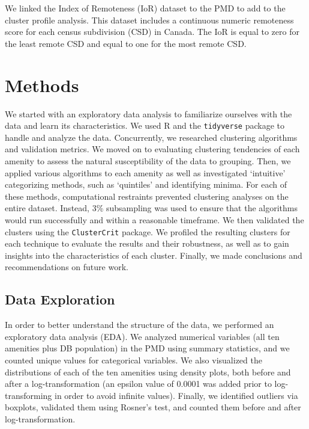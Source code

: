 \documentclass[11pt, a4paper]{article}
\begin{document}
We linked the Index of Remoteness (IoR) dataset to the PMD to add to the cluster profile analysis. This dataset includes a continuous numeric remoteness score for each census subdivision (CSD) in Canada. The IoR is equal to zero for the least remote CSD and equal to one for the most remote CSD. 









\pagebreak 
\section{Methods}

We started with an exploratory data analysis to familiarize ourselves with the data and learn its characteristics. We used R and the \texttt{tidyverse} package to handle and analyze the data. Concurrently, we researched clustering algorithms and validation metrics. We moved on to evaluating clustering tendencies of each amenity to assess the natural susceptibility of the data to grouping. Then, we applied various algorithms to each amenity as well as investigated `intuitive' categorizing methods, such as `quintiles' and identifying minima. For each of these methods, computational restraints prevented clustering analyses on the entire dataset. Instead, 3\% subsampling was used to ensure that the algorithms would run successfully and within a reasonable timeframe. We then validated the clusters using the \texttt{ClusterCrit} package. We profiled the resulting clusters for each technique to evaluate the results and their robustness, as well as to gain insights into the characteristics of each cluster. Finally, we made conclusions and recommendations on future work.







\subsection{Data Exploration}


In order to better understand the structure of the data, we performed an exploratory data analysis (EDA). We analyzed numerical variables (all ten amenities plus DB population) in the PMD using summary statistics, and we counted unique values for categorical variables. We also visualized the distributions of each of the ten amenities using density plots, both before and after a log-transformation (an epsilon value of 0.0001 was added prior to log-transforming in order to avoid infinite values). Finally, we identified outliers via boxplots, validated them using Rosner's test, and counted them before and after log-transformation.  
\end{document}
